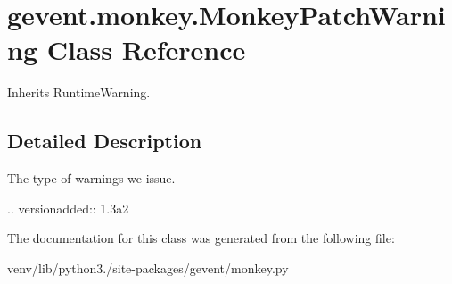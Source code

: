 \hypertarget{classgevent_1_1monkey_1_1_monkey_patch_warning}{}\section{gevent.\+monkey.\+Monkey\+Patch\+Warning Class Reference}
\label{classgevent_1_1monkey_1_1_monkey_patch_warning}


Inherits Runtime\+Warning.



\subsection{Detailed Description}
\begin{DoxyVerb}The type of warnings we issue.

.. versionadded:: 1.3a2
\end{DoxyVerb}
 

The documentation for this class was generated from the following file\+:\begin{DoxyCompactItemize}
\item 
venv/lib/python3./site-\/packages/gevent/monkey.\+py\end{DoxyCompactItemize}
